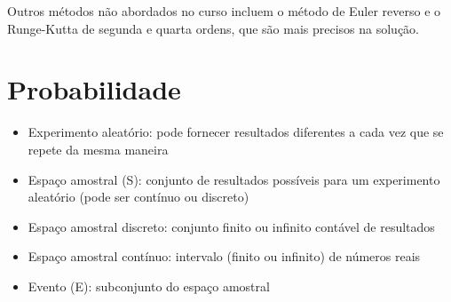 Outros métodos não abordados no curso incluem o método de Euler reverso e o Runge-Kutta de segunda e quarta ordens, que são mais precisos na solução.

\section{Probabilidade}\label{sec:probabilidade}
\begin{itemize}
	\item Experimento aleatório: pode fornecer resultados diferentes a cada vez que se repete da mesma maneira
	\item Espaço amostral (S): conjunto de resultados possíveis para um experimento aleatório (pode ser contínuo ou discreto)
	\item Espaço amostral discreto: conjunto finito ou infinito contável de resultados
	\item Espaço amostral contínuo: intervalo (finito ou infinito) de números reais
	\item Evento (E): subconjunto do espaço amostral
\end{itemize}


